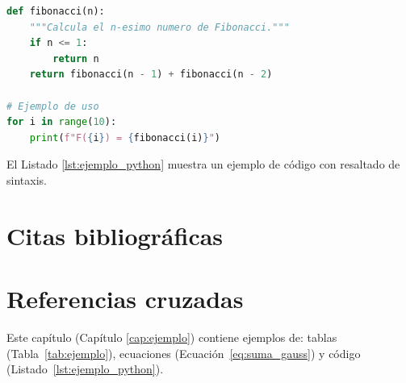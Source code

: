 \begin{lstlisting}[language=Python, caption={Ejemplo de código Python}, label={lst:ejemplo_python}]
def fibonacci(n):
    """Calcula el n-esimo numero de Fibonacci."""
    if n <= 1:
        return n
    return fibonacci(n - 1) + fibonacci(n - 2)

# Ejemplo de uso
for i in range(10):
    print(f"F({i}) = {fibonacci(i)}")
\end{lstlisting}

El Listado \ref{lst:ejemplo_python} muestra un ejemplo de código con resaltado de sintaxis. 


\section{Citas bibliográficas}
\label{sec:citas}

%
%
%
%


\section{Referencias cruzadas}
\label{sec:referencias}

%

Este capítulo (Capítulo \ref{cap:ejemplo}) contiene ejemplos de:
tablas (Tabla~\ref{tab:ejemplo}),
ecuaciones (Ecuación~\ref{eq:suma_gauss})
y código (Listado~\ref{lst:ejemplo_python}).

